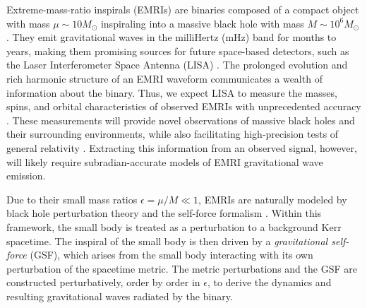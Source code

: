 \documentclass[%
 reprint,
 nofootinbib,
 amsmath,amssymb,
 aps,
 prd,
]{revtex4-2}
\begin{document}
Extreme-mass-ratio inspirals (EMRIs) are binaries composed of a compact object with mass $\mu \sim 10 M_\odot$ inspiraling into a massive black hole with mass $M \sim 10^6 M_\odot$. They emit gravitational waves in the milliHertz (mHz) band for months to years, making them promising sources for future space-based detectors, such as the Laser Interferometer Space Antenna (LISA) \cite{NASA11, ESA12}. The prolonged evolution and rich harmonic structure of an EMRI waveform communicates a wealth of information about the binary. Thus, we expect LISA to measure the masses, spins, and orbital characteristics of observed EMRIs with unprecedented accuracy \cite{BabaETC17}. These measurements will provide novel observations of massive black holes and their surrounding environments, while also facilitating high-precision tests of general relativity \cite{BerrETC19}. Extracting this information from an observed signal, however, will likely require subradian-accurate models of EMRI gravitational wave emission. 

Due to their small mass ratios $\epsilon = \mu/M \ll 1$, EMRIs are naturally modeled by black hole perturbation theory and the self-force formalism \cite{PounWard20}. Within this framework, the small body is treated as a perturbation to a background Kerr spacetime. The inspiral of the small body is then driven by a \emph{gravitational self-force} (GSF), which arises from the small body interacting with its own perturbation of the spacetime metric. The metric perturbations and the GSF are constructed perturbatively, order by order in $\epsilon$, to derive the dynamics and resulting gravitational waves radiated by the binary. 
\end{document}
